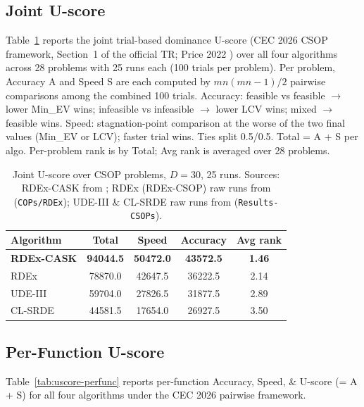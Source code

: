 \documentclass[conference]{IEEEtran}
\begin{document}
\subsection{Joint U-score}
Table~\ref{tab:uscore} reports the joint trial-based dominance U-score (CEC 2026 CSOP framework, Section~1 of the official TR; Price 2022 \cite{price2022trialbaseddominanceenablesnonparametric}) over all four algorithms across 28 problems with 25 runs each (100 trials per problem). Per problem, Accuracy A and Speed S are each computed by $mn(mn{-}1)/2$ pairwise comparisons among the combined 100 trials. Accuracy: feasible vs feasible $\to$ lower Min\_EV wins; infeasible vs infeasible $\to$ lower LCV wins; mixed $\to$ feasible wins. Speed: stagnation-point comparison at the worse of the two final values (Min\_EV or LCV); faster trial wins. Ties split 0.5/0.5. Total = A + S per algo. Per-problem rank is by Total; Avg rank is averaged over 28 problems.

\begin{table}[!t]
\centering
\caption{Joint U-score over CSOP problems, $D = 30$, 25 runs. Sources: RDEx-CASK from \cite{cask_results}; RDEx (RDEx-CSOP) raw runs from \cite{cec2025_data} (\texttt{COPs/RDEx}); UDE-III \& CL-SRDE raw runs from \cite{cec2024_data} (\texttt{Results-CSOPs}).}
\label{tab:uscore}
\footnotesize
\setlength{\tabcolsep}{4pt}
\begin{tabular}{lcccc}
\toprule
Algorithm & Total & Speed & Accuracy & Avg rank \\
\midrule
\textbf{RDEx-CASK} & \textbf{94044.5} & \textbf{50472.0} & \textbf{43572.5} & \textbf{1.46} \\
RDEx     & 78870.0 & 42647.5 & 36222.5 & 2.14 \\
UDE-III  & 59704.0 & 27826.5 & 31877.5 & 2.89 \\
CL-SRDE  & 44581.5 & 17654.0 & 26927.5 & 3.50 \\
\bottomrule
\end{tabular}
\end{table}

\subsection{Per-Function U-score}
Table~\ref{tab:uscore-perfunc} reports per-function Accuracy, Speed, \& U-score (= A + S) for all four algorithms under the CEC 2026 pairwise framework.
\end{document}
